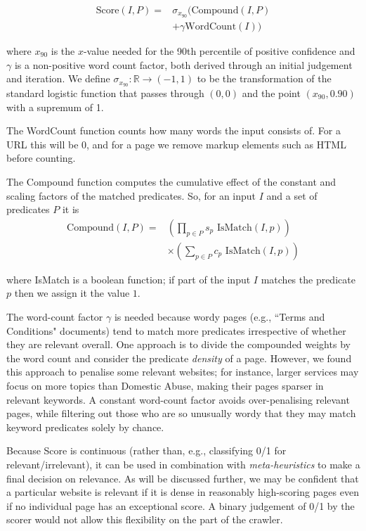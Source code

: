 \documentclass[conference]{IEEEtran}
\begin{document}
\begin{equation}
\begin{aligned}
\text{Score}(I, P) = & \sigma_{x_{90}}(\text{Compound}(I, P) \\ 
& +\gamma\text{WordCount}(I))
\end{aligned}
\label{eq:score}
\end{equation}

where $x_{90}$ is the $x$-value needed for the 90th percentile of positive confidence and $\gamma$ is a non-positive word count factor, both derived through an initial judgement and iteration.
We define  $\sigma_{x_{90}}: \mathbb{R}\rightarrow (-1,1)$ to be the transformation of the standard logistic function that passes through $(0, 0)$ and the point $(x_{90}, 0.90)$ with a supremum of 1.

The WordCount function counts how many words the input consists of. For a URL this will be 0, and for a page we remove markup elements such as HTML before counting.

The Compound function computes the cumulative effect of the constant and scaling factors of the matched predicates. So, for an input $I$ and a set of predicates $P$ it is 
\begin{equation}
\begin{aligned}
\text{Compound}(I, P) = & \left(\prod_{p\in P} s_p \text{ IsMatch}(I, p)\right) \\
& \times \left( \sum_{p\in P}c_p\text{ IsMatch}(I, p)\right)
\end{aligned}
\label{eq:comp}
\end{equation}

where IsMatch is a boolean function; if part of the input $I$ matches the predicate $p$ then we assign it the value $1$.

The word-count factor $\gamma$ is needed because wordy pages (e.g., ``Terms and Conditions" documents) tend to match more predicates irrespective of whether they are relevant overall. 
One approach is to divide the compounded weights by the word count and consider the predicate \textit{density} of a page. 
However, we found this approach to penalise some relevant websites; for instance, larger services may focus on more topics than Domestic Abuse, making their pages sparser in relevant keywords. 
A constant word-count factor avoids over-penalising relevant pages, while filtering out those who are so unusually wordy that they may match keyword predicates solely by chance.

Because Score is continuous (rather than, e.g., classifying 0/1 for relevant/irrelevant), it can be used in combination with \textit{meta-heuristics} to make a final decision on relevance. 
As will be discussed further, we may be confident that a particular website is relevant if it is dense in reasonably high-scoring pages even if no individual page has an exceptional score. 
A binary judgement of 0/1 by the scorer would not allow this flexibility on the part of the crawler.
\end{document}
